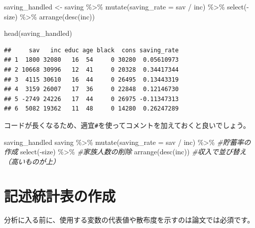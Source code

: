 \documentclass[
]{book}
\newenvironment{Shaded}{\begin{snugshade}}{\end{snugshade}}
\newcommand{\AttributeTok}[1]{\textcolor[rgb]{0.77,0.63,0.00}{#1}}
\newcommand{\CommentTok}[1]{\textcolor[rgb]{0.56,0.35,0.01}{\textit{#1}}}
\newcommand{\FunctionTok}[1]{\textcolor[rgb]{0.00,0.00,0.00}{#1}}
\newcommand{\NormalTok}[1]{#1}
\newcommand{\OtherTok}[1]{\textcolor[rgb]{0.56,0.35,0.01}{#1}}
\newcommand{\SpecialCharTok}[1]{\textcolor[rgb]{0.00,0.00,0.00}{#1}}
\begin{document}
\begin{Shaded}
\begin{Highlighting}[]
\NormalTok{saving\_handled }\OtherTok{\textless{}{-}}
\NormalTok{  saving }\SpecialCharTok{\%\textgreater{}\%}
    \FunctionTok{mutate}\NormalTok{(}\AttributeTok{saving\_rate =}\NormalTok{ sav }\SpecialCharTok{/}\NormalTok{ inc) }\SpecialCharTok{\%\textgreater{}\%}
    \FunctionTok{select}\NormalTok{(}\SpecialCharTok{{-}}\NormalTok{size) }\SpecialCharTok{\%\textgreater{}\%}
    \FunctionTok{arrange}\NormalTok{(}\FunctionTok{desc}\NormalTok{(inc))}

\FunctionTok{head}\NormalTok{(saving\_handled)}
\end{Highlighting}
\end{Shaded}

\begin{verbatim}
##     sav   inc educ age black  cons saving_rate
## 1  1800 32080   16  54     0 30280  0.05610973
## 2 10668 30996   12  41     0 20328  0.34417344
## 3  4115 30610   16  44     0 26495  0.13443319
## 4  3159 26007   17  36     0 22848  0.12146730
## 5 -2749 24226   17  44     0 26975 -0.11347313
## 6  5082 19362   11  48     0 14280  0.26247289
\end{verbatim}

コードが長くなるため、適宜\texttt{\#}を使ってコメントを加えておくと良いでしょう。

\begin{Shaded}
\begin{Highlighting}[]
\NormalTok{saving\_handled}
\NormalTok{  saving }\SpecialCharTok{\%\textgreater{}\%}
    \FunctionTok{mutate}\NormalTok{(}\AttributeTok{saving\_rate =}\NormalTok{ sav }\SpecialCharTok{/}\NormalTok{ inc) }\SpecialCharTok{\%\textgreater{}\%} \CommentTok{\#貯蓄率の作成}
    \FunctionTok{select}\NormalTok{(}\SpecialCharTok{{-}}\NormalTok{size) }\SpecialCharTok{\%\textgreater{}\%} \CommentTok{\#家族人数の削除}
    \FunctionTok{arrange}\NormalTok{(}\FunctionTok{desc}\NormalTok{(inc)) }\CommentTok{\#収入で並び替え（高いものが上）}
\end{Highlighting}
\end{Shaded}

\hypertarget{SummaryStat}{%
\chapter{記述統計表の作成}\label{SummaryStat}}

分析に入る前に、使用する変数の代表値や散布度を示すのは論文では必須です。
\end{document}
